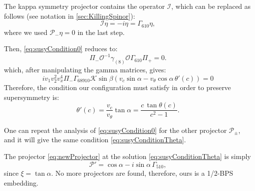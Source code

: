 The kappa symmetry projector contains the operator $\mathcal{I}$, which can be replaced as follows (see notation in \ref{sec:KillingSpinor}):
\begin{equation}
 \mathcal{I}\eta =-i \eta = \Gamma_{610} \eta,
\end{equation}
where we used $\mathcal{P}_- \eta =0$ in the last step. 

Then, \eqref{eq:susyCondition0} reduces to:
\begin{equation}
 \Pi_{-} \mathcal{O}^{-1} \gamma_{(8)} \mathcal{O} \Gamma_{610} \Pi_{+}  = 0.
\end{equation}
which, after manipulating the gamma matrices, gives:
\begin{equation}
i v_1 v_2^2 v_x^4 \Pi_- \Gamma_{6 8 9 10} \mathcal{K} \sin\beta \left(v_c \sin\alpha - v_\theta \cos\alpha \, \theta'(c)\right) = 0
\end{equation}
Therefore, the condition our configuration must satisfy in order to preserve supersymmetry is:
\begin{equation}\label{eq:susyConditionTheta}
 \theta'(c) = \dfrac{v_c}{v_\theta} \tan\alpha = \dfrac{c \, \tan\theta(c)}{c^2-1} .
\end{equation}


One can repeat the analysis of \eqref{eq:susyCondition0} for the other projector $\mathcal{P}_{\pm}$, and it will give the same condition \eqref{eq:susyConditionTheta}.


The projector \eqref{eq:newProjector} at the solution \eqref{eq:susyConditionTheta} is simply
\begin{equation}
\mathcal{P}' = \cos \alpha - i \sin \alpha \, \Gamma_{510},
\end{equation}
since $ \xi =  \tan \alpha $.
No more projectors are found, therefore, ours is a 1/2-BPS embedding.



